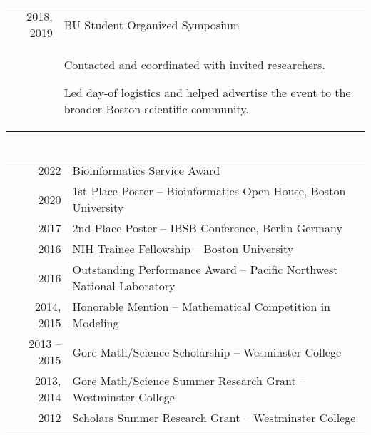 \documentclass[a4paper,10pt]{report}
\begin{document}
\begin{longtable}{rp{11.5cm}}
	\\
	2018, 2019
	 & BU Student Organized Symposium                                                                                                                                              \\[0.2em]
	 & \begin{itemize}
		   \vspace{-3.5mm}
		   \small{
		   \item Contacted and coordinated with invited researchers.
		   \item Led day-of logistics and helped advertise the event to the broader Boston scientific community.
		         }
		         \vspace{-3.5mm}
	   \end{itemize}                                                                        \\
\end{longtable}


\section{\color{linkcolour}{Honors and Awards}}
\begin{tabular}{rl}
	2022         & Bioinformatics Service Award                                           \\
	2020         & 1st Place Poster -- Bioinformatics Open House, Boston University       \\
	2017         & 2nd Place Poster -- IBSB Conference, Berlin Germany                    \\
	2016         & NIH Trainee Fellowship -- Boston University                            \\
	2016         & Outstanding Performance Award -- Pacific Northwest National Laboratory \\
	2014, 2015   & Honorable Mention -- Mathematical Competition in Modeling              \\
	2013 -- 2015 & Gore Math/Science Scholarship -- Wesminster College                    \\
	2013, 2014   & Gore Math/Science Summer Research Grant -- Westminster College         \\
	2012         & Scholars Summer Research Grant -- Westminster College
\end{tabular}
\end{document}
